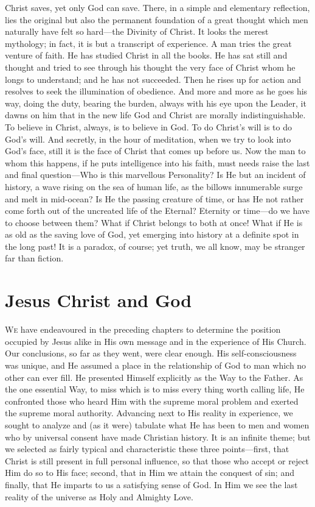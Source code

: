 \documentclass[12pt,a5paper,oneside]{book}
\begin{document}
Christ saves, yet only God can save. There,
in a simple and elementary reflection, lies the
original but also the permanent foundation of
a great thought which men naturally have felt
so hard---the Divinity of Christ. It looks
the merest mythology; in fact, it is but a
transcript of experience. A man tries the great
venture of faith. He has studied Christ in
all the books. He has sat still and thought
and tried to see through his thought the very
face of Christ whom he longs to understand;
and he has not succeeded. Then he rises up
for action and resolves to seek the illumination
of obedience. And more and more as he
goes his way, doing the duty, bearing the
burden, always with his eye upon the Leader,
it dawns on him that in the new life God
and Christ are morally indistinguishable. To
believe in Christ, always, is to believe in
God. To do Christ's will is to do God's will.
And secretly, in the hour of meditation, when
we try to look into God's face, still it is the face
of Christ that comes up before us. Now the
man to whom this happens, if he puts intelligence 
into his faith, must needs raise the last
and final question---Who is this marvellous
Personality? Is He but an incident of history,
a wave rising on the sea of human life, as
the billows innumerable surge and melt in
mid-ocean? Is He the passing creature of time,
or has He not rather come forth out of the
uncreated life of the Eternal? Eternity or
time---do we have to choose between them?
What if Christ belongs to both at once! What
if He is as old as the saving love of God, yet
emerging into history at a definite spot in the
long past! It is a paradox, of course; yet
truth, we all know, may be stranger far than
fiction.

\chapter{Jesus Christ and God}

\textsc{We} have endeavoured in the preceding
chapters to determine the position occupied
by Jesus alike in His own message and in the
experience of His Church. Our conclusions, so
far as they went, were clear enough. His self-consciousness
was unique, and He assumed a
place in the relationship of God to man which
no other can ever fill. He presented Himself
explicitly as the Way to the Father. As the one
essential Way, to miss which is to miss every
thing worth calling life, He confronted those who
heard Him with the supreme moral problem
and exerted the supreme moral authority.
Advancing next to His reality in experience,
we sought to analyze and (as it were) tabulate
what He has been to men and women who
by universal consent have made Christian
history. It is an infinite theme; but we
selected as fairly typical and characteristic
these three points---first, that Christ is still
present in full personal influence, so that
those who accept or reject Him do so to His
face; second, that in Him we attain the conquest 
of sin; and finally, that He imparts to
us a satisfying sense of God. In Him we see
the last reality of the universe as Holy and
Almighty Love.
\end{document}
